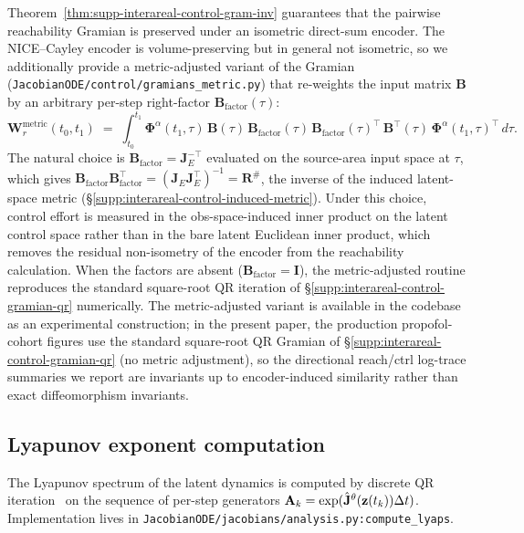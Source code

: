 Theorem~\ref{thm:supp-interareal-control-gram-inv} guarantees that the pairwise reachability Gramian is preserved under an isometric direct-sum encoder. The NICE--Cayley encoder is volume-preserving but in general not isometric, so we additionally provide a metric-adjusted variant of the Gramian (\texttt{JacobianODE/control/gramians\_metric.py}) that re-weights the input matrix $\mathbf{B}$ by an arbitrary per-step right-factor $\mathbf{B}_{\mathrm{factor}}(\tau)$:
\begin{equation}
\mathbf{W}_{r}^{\mathrm{metric}}(t_{0},t_{1}) \;=\; \int_{t_{0}}^{t_{1}} \mathbf{\Phi}^{\alpha}(t_{1},\tau)\,\mathbf{B}(\tau)\,\mathbf{B}_{\mathrm{factor}}(\tau)\,\mathbf{B}_{\mathrm{factor}}(\tau)^{\!\top}\,\mathbf{B}^{\!\top}(\tau)\,\mathbf{\Phi}^{\alpha}(t_{1},\tau)^{\!\top}\,d\tau.
\end{equation}
The natural choice is $\mathbf{B}_{\mathrm{factor}}=\mathbf{J}_{E}^{-\top}$ evaluated on the source-area input space at $\tau$, which gives $\mathbf{B}_{\mathrm{factor}}\mathbf{B}_{\mathrm{factor}}^{\!\top}=(\mathbf{J}_{E}\mathbf{J}_{E}^{\!\top})^{-1}=\mathbf{R}^{\#}$, the inverse of the induced latent-space metric (\S\ref{supp:interareal-control-induced-metric}). Under this choice, control effort is measured in the obs-space-induced inner product on the latent control space rather than in the bare latent Euclidean inner product, which removes the residual non-isometry of the encoder from the reachability calculation. When the factors are absent ($\mathbf{B}_{\mathrm{factor}}=\mathbf{I}$), the metric-adjusted routine reproduces the standard square-root QR iteration of \S\ref{supp:interareal-control-gramian-qr} numerically. The metric-adjusted variant is available in the codebase as an experimental construction; in the present paper, the production propofol-cohort figures use the standard square-root QR Gramian of \S\ref{supp:interareal-control-gramian-qr} (no metric adjustment), so the directional reach/ctrl log-trace summaries we report are invariants up to encoder-induced similarity rather than exact diffeomorphism invariants.

\subsection{Lyapunov exponent computation}\label{supp:interareal-control-lyap}

The Lyapunov spectrum of the latent dynamics is computed by discrete QR iteration~\cite{Dieci1997-yy} on the sequence of per-step generators $\mathbf{A}_{k}=\exp(\hat{\mathbf{J}}^{\theta}(\vb{z}(t_{k}))\Delta t)$. Implementation lives in \texttt{JacobianODE/jacobians/analysis.py:compute\_lyaps}.

